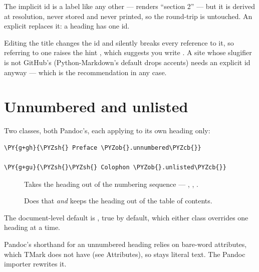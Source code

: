 \documentclass[a4paper,twoside]{article}
\begin{document}
The implicit id is a label like any other ---  renders
\enquote{section 2} --- but it is derived at resolution, never stored and never printed,
so the round-trip is untouched. An explicit  replaces it: a heading has
one id.
\begin{tscallout}[kind=warning, title={A reference to an implicit id is hinted}]
Editing the title changes the id and silently breaks every reference to it,
so referring to one raises the hint , which suggests you
write . A site whose slugifier is not GitHub's (Python-Markdown's
default  drops accents) needs an explicit id anyway --- which is the
recommendation in any case.
\end{tscallout}
\section{Unnumbered and unlisted}
Two classes, both Pandoc's, each applying to its own heading only:
\begin{tscode}[lang=md, engine=pygments]
\begin{Verbatim}[commandchars=\\\{\},breaklines, breakanywhere, commandchars=\\\{\}]
\PY{g+gh}{\PYZsh{} Preface \PYZob{}.unnumbered\PYZcb{}}

\PY{g+gu}{\PYZsh{}\PYZsh{} Colophon \PYZob{}.unlisted\PYZcb{}}
\end{Verbatim}
\end{tscode}
\begin{description}
\item[{}] Takes the heading out of the numbering sequence --- ,
, .
\item[{}] Does that \emph{and} keeps the heading out of the table of contents.
\end{description}
The document-level default is , true by default, which either
class overrides one heading at a time.
\begin{tscallout}[kind=note, title={\tscodeinline{\{-\allowbreak{}\}} is not an attribute list}]
Pandoc's shorthand for an unnumbered heading relies on bare-word
attributes, which TMark does not have (see Attributes), so
\tscodeinline{\{-\allowbreak{}\}} stays literal text. The Pandoc importer rewrites it.
\end{tscallout}
\end{document}
